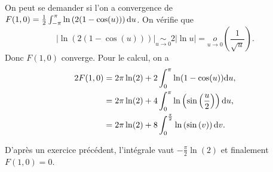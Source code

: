 \begin{remark}
    On peut se demander si l'on a convergence de $F(1,0)=\frac{1}{2}\int_{-\pi}^{\pi}\ln\left(2(1-\cos(u))\right)\mathrm{d} u$. On vérifie que 
    \begin{equation}
        \left\lvert\ln(2(1-\cos(u)))\right\vert\underset{u\to0}{\sim}2\left\lvert\ln u\right\rvert=\underset{u\to0}{o}\left(\frac{1}{\sqrt{u}}\right).
    \end{equation}
    Donc $F(1,0)$ converge. Pour le calcul, on a 
    \begin{align}
        2F(1,0)
        &=2\pi\ln(2)+2\int_{0}^{\pi}\ln(1-\cos(u))\mathrm{d} u,\\
        &=2\pi\ln(2)+4\int_{0}^{\pi}\ln\left(\sin\left(\frac{u}{2}\right)\right)\mathrm{d} u,\\
        &=2\pi\ln(2)+8\int_{0}^{\frac{\pi}{2}}\ln\left(\sin\left(v\right)\right)\mathrm{d} v.
    \end{align}

    D'après un exercice précédent, l'intégrale vaut $-\frac{\pi}{2}\ln(2)$ et finalement $F(1,0)=0$.
\end{remark}

